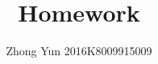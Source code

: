 \documentclass{article} %
\title{Homework }
\author{Zhong Yun 2016K8009915009}
\begin{document}
\begin{CJK*}{GBK}{song}

\maketitle
%


%
% 
%
\end{CJK*}
\end{document}
